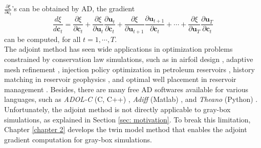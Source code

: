 $\frac{\partial \xi}{\partial \boldsymbol{c}_t}$'s can be obtained by AD, the gradient
\begin{equation} 
    \frac{d\xi}{d \boldsymbol{c}_t}= \frac{\partial \xi}{\partial \boldsymbol{c}_t} + 
    \frac{\partial \xi}{\partial \boldsymbol{u}_t}\frac{\partial \boldsymbol{u}_t}{\partial 
       \boldsymbol{c}_t} +
    \frac{\partial \xi}{\partial \boldsymbol{u}_{t+1}} \frac{\partial \boldsymbol{u}_{t+1}}{\partial
       \boldsymbol{c}_t} + \cdots +
    \frac{\partial \xi}{\partial \boldsymbol{u}_{T}} \frac{\partial \boldsymbol{u}_{T}}{\partial
       \boldsymbol{c}_t}
\end{equation}
can be computed, for all $t=1, \cdots , T$.\\

The adjoint method has seen wide applications in optimization problems constrained by 
conservation law simulations, such as in
airfoil design \cite{adjoint aerodynamics, adjoint aerodynamics 2, 
adjoint aerodynamics AD}, adaptive mesh refinement
\cite{discrete adjoint phd}, injection policy optimization in petroleum reservoirs
\cite{adjoint reservoir optimal control}, 
history matching in reservoir geophysics
\cite{review adjoint geo}, and optimal well placement in reservoir management 
\cite{adjoint well place}.
Besides, there are many free AD softwares available for various languages, such as
\emph{ADOL-C} (C, C++) \cite{adolc}, \emph{Adiff} (Matlab) \cite{adiff}, and \emph{Theano} (Python)
\cite{theano}.
Unfortunately, the adjoint method is not directly applicable
to gray-box simulations, as explained in Section \ref{sec: motivation}. 
To break this limitation, Chapter \ref{chapter 2} develops the twin model method
that enables the adjoint gradient computation for gray-box simulations.\\


